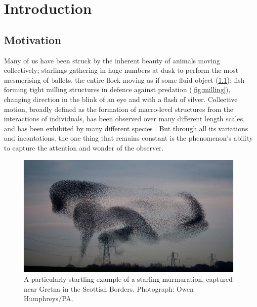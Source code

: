 \graphicspath{{fig/introduction/}}

\chapter{Introduction}
\label{cha:introduction}

\section{Motivation}
\label{sec:motivation}

Many of us have been struck by the inherent beauty of animals moving collectively;
starlings gathering in huge numbers at dusk to perform the most mesmerising of ballets,
the entire flock moving as if some fluid object (\cref{fig:murmuration}); fish forming
tight milling structures in defence against predation (\cref{fig:milling}), changing
direction in the blink of an eye and with a flash of silver.  Collective motion, broadly
defined as the formation of macro-level structures from the interactions of individuals,
has been observed over many different length scales, and has been exhibited by many
different species \parencite{allee31}. But through all its variations and incantations, the
one thing that remains constant is the phenomenon's ability to capture the attention and
wonder of the observer.


\begin{figure}[t]
    \includegraphics[width=\textwidth]{murmuration.jpg}
    \caption{A particularly startling example of a starling murmuration, captured near
        Gretna in the Scottish Borders. Photograph: Owen Humphreys/PA.}
    \label{fig:murmuration}
\end{figure}


